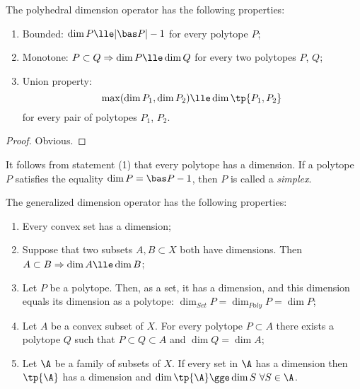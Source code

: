 \documentclass[12pt, a4paper]{article}
\begin{document}
\begin{proposition}\label{poly-dim}
    The polyhedral dimension operator has the following properties:

    \begin{enumerate}
        \item Bounded: \(\dim P \lle |\bas P| - 1\) for every polytope \(P\);
        \item Monotone: \(P \subset Q \Rightarrow \dim P \lle \dim Q\) for every two polytopes \(P\), \(Q\);
        \item Union property: \[\max (\dim{P_1}, \dim{P_2}) \lle \dim{\tp{P_1, P_2}}\] for every pair of polytopes \(P_1\), \(P_2\).
    \end{enumerate}
\end{proposition}

\begin{proof}
	Obvious.
\end{proof}

\begin{corollary}
    It follows from statement (1) that every polytope has a dimension. If a polytope \(P\) satisfies the equality \(\dim P = \bas P - 1\), then \(P\) is called a \textit{simplex}.
\end{corollary}

\begin{proposition}\label{set-dim}
    The generalized dimension operator has the following properties:

    \begin{enumerate}
        \item Every convex set has a dimension;
        
        \item Suppose that two subsets \(A, B \subset X\) both have dimensions. Then \(A \subset B \Rightarrow \dim A \lle \dim B\);
        
        \item Let \(P\) be a polytope. Then, as a set, it has a dimension, and this dimension equals its dimension as a polytope: \(\dim_{Set} P = \dim_{Poly} P = \dim P\);
        
        \item Let \(A\) be a convex subset of \(X\). For every polytope \(P \subset A\) there exists a polytope \(Q\) such that \(P \subset Q \subset A\) and \(\dim Q = \dim A\);
        
        \item Let \(\A\) be a family of subsets of \(X\). If every set in \(\A\) has a dimension then \(\tp{\A}\) has a dimension and \(\dim{\tp{\A}} \gge \dim S \ \forall S \in \A\). 
    \end{enumerate}
\end{proposition}
\end{document}
